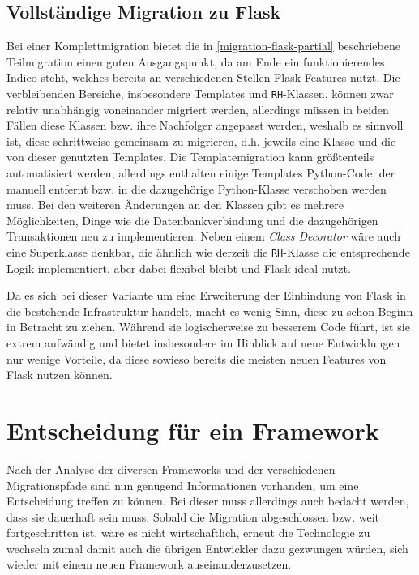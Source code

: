 \subsection{Vollständige Migration zu Flask}
Bei einer Komplettmigration bietet die in \autoref{migration-flask-partial} beschriebene
Teilmigration einen guten Ausgangspunkt, da am Ende ein funktionierendes Indico steht, welches
bereits an verschiedenen Stellen Flask-Features nutzt. Die verbleibenden Bereiche, insbesondere
Templates und \lstinline{RH}-Klassen, können zwar relativ unabhängig voneinander migriert werden,
allerdings müssen in beiden Fällen diese Klassen bzw. ihre Nachfolger angepasst werden, weshalb es
sinnvoll ist, diese schrittweise gemeinsam zu migrieren, d.h. jeweils eine Klasse und die von dieser
genutzten Templates. Die Templatemigration kann größtenteils automatisiert werden, allerdings
enthalten einige Templates Python-Code, der manuell entfernt bzw. in die dazugehörige Python-Klasse
verschoben werden muss. Bei den weiteren Änderungen an den Klassen gibt es mehrere Möglichkeiten,
Dinge wie die Datenbankverbindung und die dazugehörigen Transaktionen neu zu implementieren.
Neben einem \emph{Class Decorator} wäre auch eine Superklasse denkbar, die ähnlich wie derzeit die
\lstinline{RH}-Klasse die entsprechende Logik implementiert, aber dabei flexibel bleibt und Flask
ideal nutzt.

Da es sich bei dieser Variante um eine Erweiterung der Einbindung von Flask in die bestehende
Infrastruktur handelt, macht es wenig Sinn, diese zu schon Beginn in Betracht zu ziehen. Während sie
logischerweise zu besserem Code führt, ist sie extrem aufwändig und bietet insbesondere im Hinblick
auf neue Entwicklungen nur wenige Vorteile, da diese sowieso bereits die meisten neuen Features von
Flask nutzen können.


\section{Entscheidung für ein Framework}
Nach der Analyse der diversen Frameworks und der verschiedenen Migrationspfade sind nun genügend
Informationen vorhanden, um eine Entscheidung treffen zu können. Bei dieser muss allerdings auch
bedacht werden, dass sie dauerhaft sein muss. Sobald die Migration abgeschlossen bzw. weit fortgeschritten
ist, wäre es nicht wirtschaftlich, erneut die Technologie zu wechseln zumal damit auch die übrigen
Entwickler dazu gezwungen würden, sich wieder mit einem neuen Framework auseinanderzusetzen.

